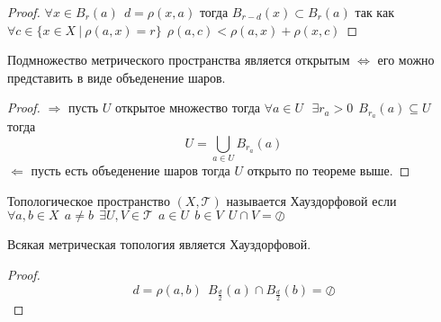 \begin{proof}
  $\forall x \in B_r(a) ~~ d = \rho(x, a)$ тогда $B_{r-d}(x) \subset B_r(a)$
  так как $\forall c \in \{x \in X ~ |~ \rho(a,x) = r\} ~~
  \rho(a,c) < \rho(a,x) + \rho(x,c)$
\end{proof}

\begin{theorem}
  Подмножество метрического пространства является открытым $\Leftrightarrow$
  его можно представить в виде объеденение шаров.
\end{theorem}

\begin{proof}
  $\Rightarrow$ пусть $U$ открытое множество тогда $\forall a \in U ~~~
  \exists r_a > 0 ~~ B_{r_a}(a) \subseteq U$ тогда
  $$
  U = \bigcup_{a \in U} B_{r_a}(a)
  $$
  $\Leftarrow$ пусть есть объеденение шаров тогда $U$ открыто по теореме выше.
\end{proof}

\begin{define}
  Топологическое пространство $(X, \mathcal{T})$ называется Хауздорфовой если
  $\forall a,b \in X ~~ a \not= b ~~ \exists U, V \in \mathcal{T} ~~
  a \in U ~~ b \in V ~~ U \cap V = \oslash$
\end{define}

\begin{theorem}
  Всякая метрическая топология является Хауздорфовой.
\end{theorem}

\begin{proof}
  $$
  d = \rho(a,b) ~~ B_{\frac{d}{2}}(a) \cap B_{\frac{d}{2}}(b) = \oslash
  $$
\end{proof}
